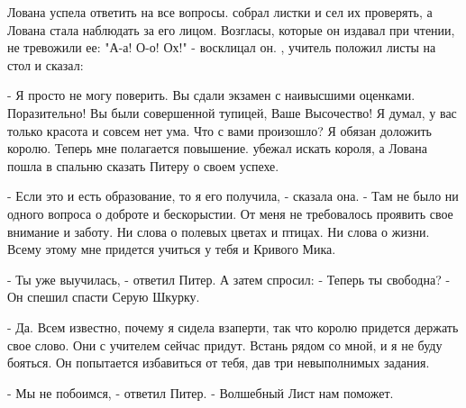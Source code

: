 Лована успела ответить на все вопросы.
 собрал листки и сел их проверять, а Лована стала наблюдать 
за его лицом. Возгласы, которые он издавал при чтении, не тревожили 
ее: "А-а! О-о! Ох!" - восклицал он.
, учитель положил листы на стол и сказал:
\par- Я просто не могу поверить. Вы сдали экзамен с наивысшими 
оценками. Поразительно! Вы были совершенной тупицей, Ваше Высочество! 
Я думал, у вас только красота и совсем нет ума. Что с вами произошло? 
Я обязан доложить королю. Теперь мне полагается повышение.
 убежал искать короля, а Лована пошла в спальню сказать Питеру о 
своем успехе.
\par- Если это и есть образование, то я его получила, - сказала она. - 
Там не было ни одного вопроса о доброте и бескорыстии. От меня не 
требовалось проявить свое внимание и заботу. Ни слова о полевых цветах 
и птицах. Ни слова о жизни. Всему этому мне придется учиться у тебя и 
Кривого Мика.
\par- Ты уже выучилась, - ответил Питер. А затем спросил: - Теперь ты 
свободна? - Он спешил спасти Серую Шкурку.
\par- Да. Всем известно, почему я сидела взаперти, так что королю 
придется держать свое слово. Они с учителем сейчас придут. Встань 
рядом со мной, и я не буду бояться. Он попытается избавиться от тебя, 
дав три невыполнимых задания.
\par- Мы не побоимся, - ответил Питер. - Волшебный Лист нам поможет.
